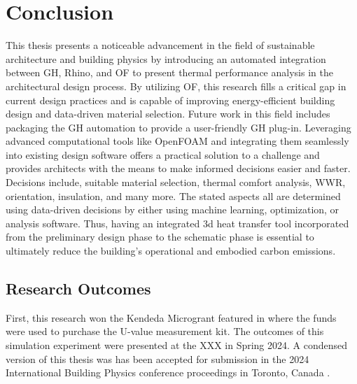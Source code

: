 \chapter{Conclusion}
This thesis presents a noticeable advancement in the field of sustainable architecture and building physics by introducing an automated integration between GH, Rhino, and OF to present thermal performance analysis in the architectural design process. 
By utilizing OF, this research fills a critical gap in current design practices and is capable of improving energy-efficient building design and data-driven material selection. 
Future work in this field includes packaging the GH automation to provide a user-friendly GH plug-in. Leveraging advanced computational tools like OpenFOAM and integrating them seamlessly into existing design software offers a practical solution to a challenge and provides architects with the means to make informed decisions easier and faster. 
Decisions include, suitable material selection, thermal comfort analysis, WWR, orientation, insulation, and many more. 
The stated aspects all are determined using data-driven decisions by either using machine learning, optimization, or analysis software. Thus, having an integrated 3d heat transfer tool incorporated from the preliminary design phase to the schematic phase is essential to ultimately reduce the building's operational and embodied carbon emissions. 

\section{Research Outcomes}
First, this research won the Kendeda Microgrant featured in \cite{kendeda} where the funds were used to purchase the U-value measurement kit. 
The outcomes of this simulation experiment were presented at the XXX in Spring 2024. 
A condensed version of this thesis was has been accepted for submission in the 2024 International Building Physics conference proceedings in Toronto, Canada \cite{ibpc}. 

